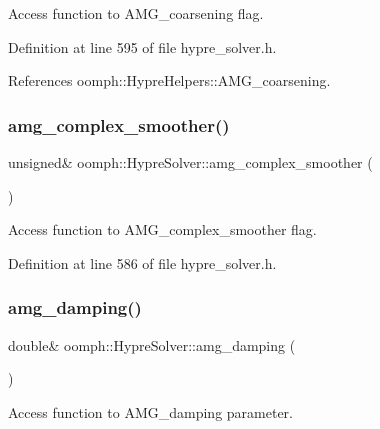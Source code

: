 Access function to A\+M\+G\+\_\+coarsening flag. 



Definition at line 595 of file hypre\+\_\+solver.\+h.



References oomph\+::\+Hypre\+Helpers\+::\+A\+M\+G\+\_\+coarsening.

\mbox{\label{classoomph_1_1HypreSolver_a71d527f704e0fffaa736f40a483e78e4}} 
\subsubsection{\texorpdfstring{amg\+\_\+complex\+\_\+smoother()}{amg\_complex\_smoother()}}
{\footnotesize\ttfamily unsigned\& oomph\+::\+Hypre\+Solver\+::amg\+\_\+complex\+\_\+smoother (\begin{DoxyParamCaption}{ }\end{DoxyParamCaption})\hspace{0.3cm}{\ttfamily [inline]}}



Access function to A\+M\+G\+\_\+complex\+\_\+smoother flag. 



Definition at line 586 of file hypre\+\_\+solver.\+h.

\mbox{\label{classoomph_1_1HypreSolver_a0d1cd41ca27ea448f4c07e276b223cff}} 
\subsubsection{\texorpdfstring{amg\+\_\+damping()}{amg\_damping()}}
{\footnotesize\ttfamily double\& oomph\+::\+Hypre\+Solver\+::amg\+\_\+damping (\begin{DoxyParamCaption}{ }\end{DoxyParamCaption})\hspace{0.3cm}{\ttfamily [inline]}}



Access function to A\+M\+G\+\_\+damping parameter. 




